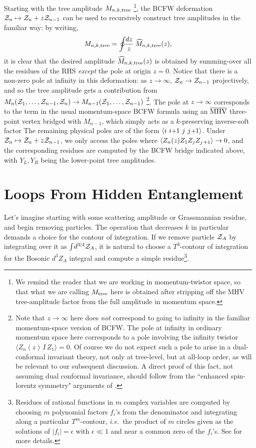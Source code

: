 \documentclass[11pt, reqno]{article}
\newcommand{\be}{\begin{eqnarray}}
\newcommand{\ee}{\end{eqnarray}}
\newcommand{\smallplus}{\hspace{0.5pt}\text{{\small+}}\hspace{-0.5pt}}
\newcommand{\ab}[1]{\langle #1\rangle}
\begin{document}
Starting with the tree amplitude $M_{n,k,{\rm tree}}$ \footnote{We remind the reader that we are working in momentum-twistor space, so that what
we are calling $M_{{\rm tree}}$ here is obtained after stripping off the MHV tree-amplitude factor from the full amplitude in momentum space.}, the BCFW deformation ${\cal Z}_n \mapsto {\cal Z}_n + z {\cal Z}_{n-1}$ can
be used to recursively construct tree amplitudes in the familiar
way: by writing, \be M_{n,k,{\rm tree}} = \oint\!\!\frac{dz}{z}\;
\widehat{M}_{n,k,{\rm tree}}(z), \ee it is clear that the desired
amplitude $ \widehat{M}_{n,k,{\rm tree}}(z)$ is obtained by summing-over all the  residues of the RHS {\it except} the pole at origin
$z=0$. Notice that there is a non-zero pole at infinity in this
deformation: as $z \to \infty$, ${\cal Z}_n \to {\cal Z}_{n-1}$
projectively, and so the tree amplitude gets a contribution from
\mbox{$M_n({\cal Z}_1, \ldots,{\cal Z}_{n-1},{\cal Z}_n) \to
M_{n-1}({\cal Z}_1, \ldots,{\cal Z}_{n-1})$}
\footnote{Note that $z \to \infty$ here does {\it not} correspond to going to infinity in the familiar momentum-space
version of BCFW. The  pole at infinity in ordinary momentum space here corresponds to a pole involving the infinity twistor $\langle
Z_n(z)\,I\,Z_1\rangle=0$. Of course we do not expect such a pole to arise in a dual-conformal invariant theory, not only at tree-level, but at all-loop order, as will be relevant to
our subsequent discussion. A direct proof of this fact, not assuming dual conformal invariance, should follow from the ``enhanced spin-lorentz symmetry" arguments of \cite{ArkaniHamed:2008yf}.}. The pole at $z \to \infty$ corresponds to
the term in the usual momentum-space BCFW formula using an $\overline{\rm MHV}$
three-point vertex bridged with $M_{n-1}$, which simply acts as a
$k$-preserving inverse-soft factor The remaining physical poles are of the form $\ab{i \,\, i\smallplus1 \,\,
j \,\, j\smallplus1}$. Under ${\cal Z}_n \mapsto {\cal Z}_n + z
{\cal Z}_{n-1}$, we only access the poles where $\ab{Z_n(z)Z_1 Z_j
Z_{j\smallplus1}} \to 0$, and the corresponding residues are
computed by the BCFW bridge indicated above, with $Y_L,Y_R$ being
the lower-point tree amplitudes.


\section{Loops From Hidden Entanglement}\label{loops_as_hidden_entanglement}

Let's imagine starting with some scattering amplitude or Grassmannian residue, and begin removing particles. The operation that decreases $k$ in particular demands a choice for the contour of integration. If we remove particle ${\cal Z}_A$ by integrating over it as $\int\!d^{3|4}{\cal Z}_A$, it is natural to choose a $T^3$-contour of integration for the Bosonic $d^3 Z_A$ integral and compute a simple residue\footnote{Residues of rational functions in $m$ complex variables are computed by choosing $m$ polynomial factors $f_i$'s from the denominator and integrating along a particular $T^m$-contour, {\it i.e.}~the product of $m$ circles given as the solutions of $|f_i|=\epsilon$ with $\epsilon \ll 1$ and near a common zero of the $f_i$'s. See \cite{Griffiths:1978a} for more details.}.
\end{document}
